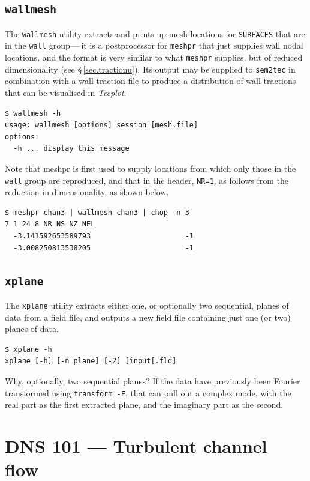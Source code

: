\documentclass[11pt]{report}
\newcommand{\Tecplot}{\emph{Tecplot}}
\begin{document}
\section{\texttt{wallmesh}}
\label{sec.wallmesh}

The \verb|wallmesh| utility extracts and prints up mesh locations for
\verb|SURFACES| that are in the \verb|wall| group\,---\,it is a
postprocessor for \verb|meshpr| that just supplies wall nodal
locations, and the format is very similar to what \verb|meshpr|
supplies, but of reduced dimensionality (see \S\,\ref{sec.tractionu}).
Its output may be supplied to \verb|sem2tec| in combination with a
wall traction file to produce a distribution of wall tractions that
can be visualised in \Tecplot.
%
{\small
\begin{verbatim}
$ wallmesh -h
usage: wallmesh [options] session [mesh.file]
options:
  -h ... display this message
\end{verbatim}
}
%
Note that meshpr is first used to supply locations from which only
those in the \verb|wall| group are reproduced, and that in the header,
\verb|NR=1|, as follows from the reduction in dimensionality, as shown
below.  {\small
\begin{verbatim}
$ meshpr chan3 | wallmesh chan3 | chop -n 3
7 1 24 8 NR NS NZ NEL
  -3.141592653589793                      -1
  -3.008250813538205                      -1
\end{verbatim}
}
%

\section{\texttt{xplane}}
\label{sec.xplane}

The \verb|xplane| utility extracts either one, or optionally two
sequential, planes of data from a field file, and outputs a new field
file containing just one (or two) planes of data.
%
{\small
\begin{verbatim}
$ xplane -h
xplane [-h] [-n plane] [-2] [input[.fld]
\end{verbatim}
}
%
Why, optionally, two sequential planes?  If the data have previously
been Fourier transformed using \texttt{transform -F}, that can pull
out a complex mode, with the real part as the first extracted plane,
and the imaginary part as the second.

\chapter{DNS 101 --- Turbulent channel flow}
\label{ch.dns101}
\end{document}

